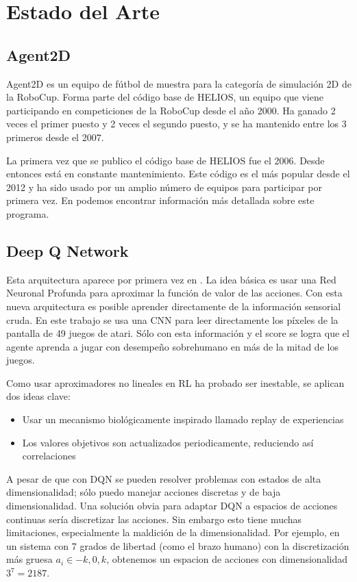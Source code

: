 \chapter{Estado del Arte}

\section{Agent2D}
\label{sec:agent2d}
Agent2D es un equipo de fútbol de muestra para la categoría de simulación 2D de la RoboCup. Forma parte del código base de HELIOS, un equipo que viene participando en competiciones de la RoboCup desde el año 2000. Ha ganado 2 veces el primer puesto y 2 veces el segundo puesto, y se ha mantenido entre los 3 primeros desde el 2007.

La primera vez que se publico el código base de HELIOS fue el 2006. Desde entonces está en constante mantenimiento. Este código es el más popular desde el 2012 y ha sido usado por un amplio número de equipos para participar por primera vez. En \cite{akiyama2013helios} podemos encontrar información más detallada sobre este programa.


\section{Deep Q Network}

Esta arquitectura aparece por primera vez en \cite{mnih2015human}. La idea básica es usar una Red Neuronal Profunda para aproximar la función de valor de las acciones. Con esta nueva arquitectura es posible aprender directamente de la información sensorial cruda. En este trabajo se usa una \ac{CNN} para leer directamente los píxeles de la pantalla de 49 juegos de atari. Sólo con esta información y el score se logra que el agente aprenda a jugar con desempeño sobrehumano en más de la mitad de los juegos.

Como usar aproximadores no lineales en \ac{RL} ha probado ser inestable, se aplican dos ideas clave:

\begin{itemize}
\item Usar un mecanismo biológicamente inspirado llamado replay de experiencias
\item Los valores objetivos son actualizados periodicamente, reduciendo así correlaciones 
\end{itemize}

A pesar de que con \ac{DQN} se pueden resolver problemas con estados de alta dimensionalidad; sólo puedo manejar acciones discretas y de baja dimensionalidad. Una solución obvia para adaptar \ac{DQN} a espacios de acciones continuas sería discretizar las acciones. Sin embargo esto tiene muchas limitaciones, especialmente la maldición de la dimensionalidad. Por ejemplo, en un sistema con 7 grados de libertad (como el brazo humano) con la discretización más gruesa $a_i \in {-k, 0, k}$, obtenemos un espacion de acciones con dimensionalidad $3^7=2187$.


